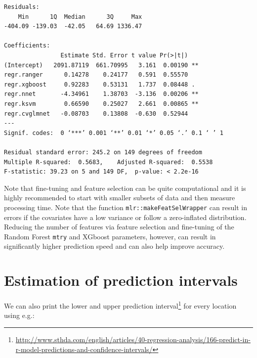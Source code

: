 \documentclass[
  graybox,natbib,nospthms]{svmono}
\newenvironment{Shaded}{\begin{snugshade}}{\end{snugshade}}
\newcommand{\CommentTok}[1]{\textcolor[rgb]{0.37,0.37,0.37}{\textit{#1}}}
\newcommand{\DecValTok}[1]{\textcolor[rgb]{0.06,0.06,0.06}{#1}}
\newcommand{\FunctionTok}[1]{\textcolor[rgb]{0,0,0}{#1}}
\newcommand{\NormalTok}[1]{#1}
\newcommand{\SpecialCharTok}[1]{\textcolor[rgb]{0,0,0}{#1}}
\renewcommand{\href}[2]{#2 (\url{#1})}
\renewcommand{\href}[2]{#2\footnote{\url{#1}}}
\begin{document}
\begin{verbatim}
Residuals:
    Min      1Q  Median      3Q     Max 
-404.09 -139.03  -42.05   64.69 1336.47 

Coefficients:
                Estimate Std. Error t value Pr(>|t|)   
(Intercept)   2091.87119  661.70995   3.161  0.00190 **
regr.ranger      0.14278    0.24177   0.591  0.55570   
regr.xgboost     0.92283    0.53131   1.737  0.08448 . 
regr.nnet       -4.34961    1.38703  -3.136  0.00206 **
regr.ksvm        0.66590    0.25027   2.661  0.00865 **
regr.cvglmnet   -0.08703    0.13808  -0.630  0.52944   
---
Signif. codes:  0 ‘***’ 0.001 ‘**’ 0.01 ‘*’ 0.05 ‘.’ 0.1 ‘ ’ 1

Residual standard error: 245.2 on 149 degrees of freedom
Multiple R-squared:  0.5683,    Adjusted R-squared:  0.5538 
F-statistic: 39.23 on 5 and 149 DF,  p-value: < 2.2e-16
\end{verbatim}

Note that fine-tuning and feature selection can be quite computational and it is
highly recommended to start with smaller subsets of data and then measure processing
time. Note that the function \texttt{mlr::makeFeatSelWrapper} can result in errors if
the covariates have a low variance or follow a zero-inflated distribution.
Reducing the number of features via feature selection and fine-tuning of the Random
Forest \texttt{mtry} and XGboost parameters, however, can result in significantly higher
prediction speed and can also help improve accuracy.

\hypertarget{estimation-of-prediction-intervals}{%
\section{Estimation of prediction intervals}\label{estimation-of-prediction-intervals}}

We can also print the lower and upper \href{http://www.sthda.com/english/articles/40-regression-analysis/166-predict-in-r-model-predictions-and-confidence-intervals/}{prediction interval} for every location using e.g.:

\begin{Shaded}
\end{Shaded}
\end{document}
